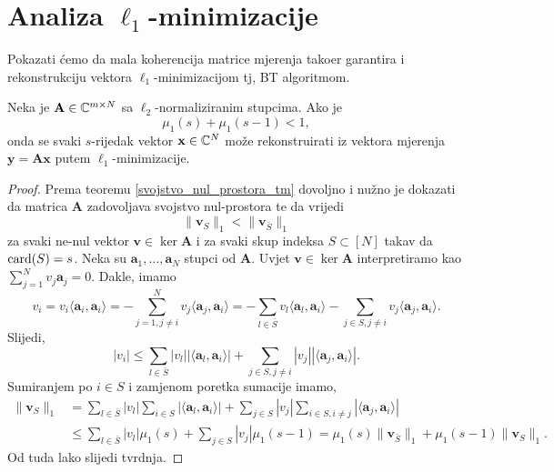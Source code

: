 \documentclass[a4paper,twoside,12pt]{memoir} %
\newcommand{\vect}[1]{\mathbf{#1}}
\renewcommand{\vec}{\vect}
\newcommand{\card}{\text{\normalfont{card}}}
\newcommand{\norm}[1]{\|{#1}\|}
\begin{document}
\section[Analiza $\ell_1$-minimizacije][Analiza $\ell_1$-minimizacije]{Analiza $\ell_1$-minimizacije}
Pokazati \'cemo da mala koherencija matrice mjerenja tako\dj er garantira i rekonstrukciju vektora $\ell_1$-minimizacijom tj, BT algoritmom.
\begin{thm}\label{tm:5:15}
    Neka je $\vec A \in \C^{m \times N}$ sa $\ell_2$-normaliziranim stupcima. Ako je 
    \begin{equation}\label{5:13}
        \mu_1(s) + \mu_1(s-1) < 1, 
    \end{equation}
    onda se svaki $s$-rijedak vektor $\vec x \in \C^N$ mo\v{z}e rekonstruirati iz vektora mjerenja $\vec y = \vec{Ax}$ putem $\ell_1$-minimizacije.
\end{thm}
\begin{proof}
    Prema teoremu \ref{svojstvo_nul_prostora_tm} dovoljno i nu\v{z}no je dokazati da matrica $\vec A$ zadovoljava svojstvo nul-prostora te da vrijedi
    \begin{equation}\label{5:14}
        \norm{\vec v_S}_1 < \norm{\vec v_{\bar S}}_1 
    \end{equation}
    za svaki ne-nul vektor $\vec v \in \ker \vec A$ i za svaki skup indeksa $S \subset [N]$ takav da $\card(S) = s$. Neka su $\vec a_1, \dots, \vec a_N$ stupci od $\vec A$. Uvjet $\vec v \in \ker \vec A$ interpretiramo kao $\sum_{j=1}^N v_j \vec a_j = 0$. Dakle, imamo
    \begin{equation*}
        v_i = v_i \langle \vec a_i, \vec a_i \rangle = - \sum_{j=1,j \neq i}^N v_j \langle \vec a_j, \vec a_i \rangle = - \sum_{l \in \bar S}v_l \langle \vec a_l, \vec a_i \rangle - \sum_{j \in S,j \neq i} v_j \langle \vec a_j, \vec a_i \rangle.
    \end{equation*}
    Slijedi,
    \begin{equation*}
        |v_i| \leq \sum_{l \in \bar S}|v_l||\langle \vec a_l, \vec a_i\rangle| + \sum_{j \in S, j \neq i} |v_j||\langle \vec a_j, \vec a_i \rangle|.
    \end{equation*}
    Sumiranjem po $i \in S$ i zamjenom poretka sumacije imamo,
    \begin{align*}
        \norm{\vec v_S}_1 &= \sum_{l \in \bar S}|v_l|\sum_{i \in S} |\langle \vec a_l, \vec a_i \rangle| + \sum_{j \in S}|v_j| \sum_{i \in S,i \neq j}|\langle \vec a_j, \vec a_i \rangle| \\
        &\leq \sum_{l \in \bar S} |v_l| \mu_1(s) + \sum_{j \in S}|v_j| \mu_1(s-1) = \mu_1(s) \norm{\vec v_{\bar S}}_1 + \mu_1(s-1) \norm{\vec v_S}_1.
    \end{align*}
    Od tuda lako slijedi tvrdnja.
\end{proof}
\end{document}
